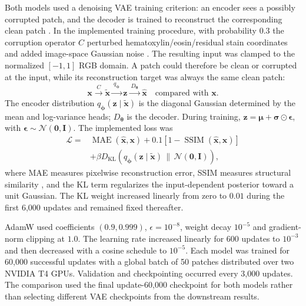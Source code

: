 \documentclass{midl}
\begin{document}
Both models used a denoising VAE training criterion: an encoder sees a possibly corrupted patch, and the decoder is trained to reconstruct the corresponding clean patch \cite{im_denoising_2017}. In the implemented training procedure, with probability $0.3$ the corruption operator $C$ perturbed hematoxylin/eosin/residual stain coordinates and added image-space Gaussian noise \cite{ruifrok_color_2001}. The resulting input was clamped to the normalized $[-1,1]$ RGB domain. A patch could therefore be clean or corrupted at the input, while its reconstruction target was always the same clean patch:
\begin{equation}
\mathbf{x}\xrightarrow{\ C\ }\widetilde{\mathbf{x}}
\xrightarrow{\ q_{\boldsymbol{\phi}}\ }\mathbf{z}
\xrightarrow{\ D_{\boldsymbol{\theta}}\ }\widehat{\mathbf{x}}
\quad\text{compared with }\mathbf{x}.
\label{eq:denoise-path}
\end{equation}
The encoder distribution $q_{\boldsymbol{\phi}}(\mathbf{z}\mid\widetilde{\mathbf{x}})$ is the diagonal Gaussian determined by the mean and log-variance heads; $D_{\boldsymbol{\theta}}$ is the decoder. During training, $\mathbf{z}=\boldsymbol{\mu}+\boldsymbol{\sigma}\odot\boldsymbol{\epsilon}$, with $\boldsymbol{\epsilon}\sim\mathcal{N}(\mathbf{0},\mathbf{I})$. The implemented loss was
\begin{equation}
\begin{aligned}
\mathcal{L}={}&\operatorname{MAE}(\widehat{\mathbf{x}},\mathbf{x})
+0.1[1-\operatorname{SSIM}(\widehat{\mathbf{x}},\mathbf{x})]\\
&+\beta D_{\mathrm{KL}}\!\left(
q_{\boldsymbol{\phi}}(\mathbf{z}\mid\widetilde{\mathbf{x}})
\,\|\,\mathcal{N}(\mathbf{0},\mathbf{I})\right),
\end{aligned}
\label{eq:vae-loss}
\end{equation}
where MAE measures pixelwise reconstruction error, SSIM measures structural similarity \cite{wang_image_2004}, and the KL term regularizes the input-dependent posterior toward a unit Gaussian. The KL weight increased linearly from zero to $0.01$ during the first 6,000 updates and remained fixed thereafter.

AdamW \cite{loshchilov_adamw_2019} used coefficients $(0.9,0.999)$, $\epsilon=10^{-8}$, weight decay $10^{-5}$ and gradient-norm clipping at $1.0$. The learning rate increased linearly for 600 updates to $10^{-3}$ and then decreased with a cosine schedule to $10^{-5}$. Each model was trained for 60,000 successful updates with a global batch of 50 patches distributed over two NVIDIA T4 GPUs. Validation and checkpointing occurred every 3,000 updates. The comparison used the final update-60,000 checkpoint for both models rather than selecting different VAE checkpoints from the downstream results.
\end{document}

